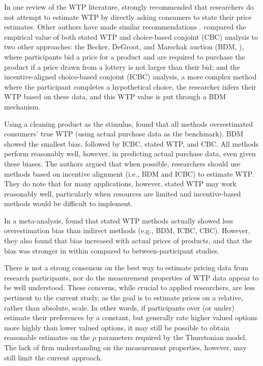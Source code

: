 In one review of the WTP literature, \textcite{breidertREVIEWMETHODSMEASURING2006} strongly recommended that researchers do not attempt to estimate WTP by directly asking consumers to state their price estimates. Other authors have made similar recommendations \textcite{jedidi2009willingness}. \textcite{miller2011should} compared the empirical value of both stated WTP and choice-based conjoint (CBC) analysis to two other approaches: the Becker, DeGroot, and Marschak auction (BDM, \textcite{becker1964measuring}), where participants bid a price for a product and are required to purchase the product if a price drawn from a lottery is not larger than their bid; and the incentive-aligned choice-based conjoint (ICBC) analysis, a more complex method where the participant completes a hypothetical choice, the researcher infers their WTP based on these data, and this WTP value is put through a BDM mechanism. 

Using a cleaning product as the stimulus, \textcite{miller2011should} found that all methods overestimated consumers' true WTP (using actual purchase data as the benchmark). BDM showed the smallest bias, followed by ICBC, stated WTP, and CBC. All methods perform reasonably well, however, in predicting actual purchase data, even given these biases. The authors argued that when possible, researchers should use methods based on incentive alignment (i.e., BDM and ICBC) to estimate WTP. They do note that for many applications, however, stated WTP may work reasonably well, particularly when resources are limited and incentive-based methods would be difficult to implement.

In a meta-analysis, \textcite{schmidtAccuratelyMeasuringWillingness2020} found that stated WTP methods actually showed less overestimation bias than indirect methods (e.g., BDM, ICBC, CBC). However, they also found that bias increased with actual prices of products, and that the bias was stronger in within compared to between-participant studies.

There is not a strong consensus on the best way to estimate pricing data from research participants, nor do the measurement properties of WTP data appear to be well understood. These concerns, while crucial to applied researchers, are less pertinent to the current study, as the goal is to estimate prices on a relative, rather than absolute, scale. In other words, if participants over (or under) estimate their preferences by a constant, but generally rate higher valued options more highly than lower valued options, it may still be possible to obtain reasonable estimates on the $\rho$ parameters required by the Thurstonian model. The lack of firm understanding on the measurement properties, however, may still limit the current approach. 

